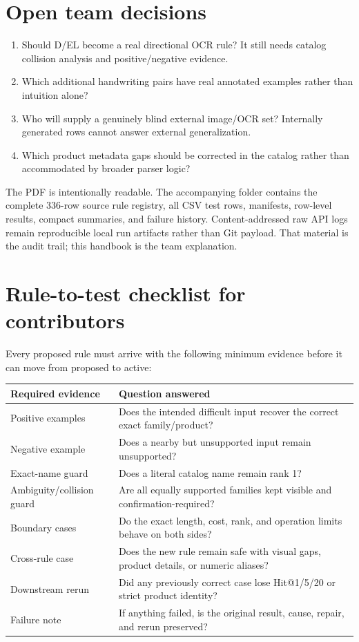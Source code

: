 \documentclass[10pt,a4paper]{article}
\begin{document}
\section{Open team decisions}

\begin{enumerate}
\item Should D/EL become a real directional OCR rule? It still needs catalog
collision analysis and positive/negative evidence.
\item Which additional handwriting pairs have real annotated examples rather
than intuition alone?
\item Who will supply a genuinely blind external image/OCR set? Internally
generated rows cannot answer external generalization.
\item Which product metadata gaps should be corrected in the catalog rather
than accommodated by broader parser logic?
\end{enumerate}

\begin{takeaway}[title=Companion evidence]
The PDF is intentionally readable. The accompanying folder contains the
complete 336-row source rule registry, all CSV test rows, manifests, row-level
results, compact summaries, and failure history. Content-addressed raw API logs
remain reproducible local run artifacts rather than Git payload. That material
is the audit trail; this handbook is the team explanation.
\end{takeaway}

\appendix
\section{Rule-to-test checklist for contributors}

Every proposed rule must arrive with the following minimum evidence before it
can move from proposed to active:

\begin{tabularx}{\textwidth}{@{}L{43mm}Y@{}}
\toprule
Required evidence & Question answered \\
\midrule
Positive examples & Does the intended difficult input recover the correct exact family/product? \\
Negative example & Does a nearby but unsupported input remain unsupported? \\
Exact-name guard & Does a literal catalog name remain rank 1? \\
Ambiguity/collision guard & Are all equally supported families kept visible and confirmation-required? \\
Boundary cases & Do the exact length, cost, rank, and operation limits behave on both sides? \\
Cross-rule case & Does the new rule remain safe with visual gaps, product details, or numeric aliases? \\
Downstream rerun & Did any previously correct case lose Hit@1/5/20 or strict product identity? \\
Failure note & If anything failed, is the original result, cause, repair, and rerun preserved? \\
\bottomrule
\end{tabularx}
\end{document}
